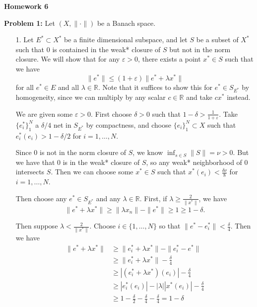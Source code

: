 \documentclass[11pt, reqno]{article}
\theoremstyle{plain}
\theoremstyle{definition}
\theoremstyle{remark}
\renewcommand{\epsilon}{\varepsilon}
\newcommand{\RR}{\mathbb{R}}
\begin{document}
\topmargin=-40pt
\renewcommand{\headrulewidth}{1pt}
\renewcommand{\headsep}{20pt}
\thispagestyle{fancy}

{\Huge \bfseries \noindent Homework 6}

\textbf{Problem 1:} Let $(X, \|\cdot\|)$ be a Banach space.

\begin{enumerate}
    \item[1.] Let $E^* \subset X^*$ be a finite dimensional subspace, and let $S$ be a subset
    of $X^*$ such that $0$ is contained in the weak* closure of $S$ but not in the norm closure. We will 
    show that for any $\epsilon > 0$, there exists a point $x^* \in S$ such that we have 
    \[
        \|e^*\| \leq (1 + \epsilon)\|e^* + \lambda x^*\|
    \]
    for all $e^* \in E$ and all $\lambda \in \RR$. Note that it suffices to show this for $e^* \in S_{E^*}$ by 
    homogeneity, since we can multiply by any scalar $c \in \RR$ and take $c x^*$ instead.

    We are given some $\epsilon > 0$. First choose $\delta > 0$ such that $1 - \delta > \frac{1}{1 + \epsilon}$.
    Take $\{e_i^*\}_1^N$ a $\delta/4$ net in $S_{E^*}$ by compactness, and choose $\{e_i\}_1^N \subset X$ such that 
    $e_i^*(e_i) > 1 - \delta/2$ for $i = 1, \dots, N$. 

    Since $0$ is not in the norm closure of $S$, we know $\inf_{s \in S}\|S\| = \nu > 0$. But we have that $0$ is
    in the weak* closure of $S$, so any weak* neighborhood of $0$ intersects $S$. Then we can choose some $x^* \in S$
    such that $x^*(e_i) < \frac{\delta \nu}{8}$ for $i = 1, \dots, N$. 

    Then choose any $e^* \in S_{E^*}$ and any $\lambda \in \RR$. First, if $\lambda \geq \frac{2}{\|x^*\|}$, we have 
    \[
        \|e^* + \lambda x^*\| \geq \|\lambda x_n\| - \|e^*\| \geq 1 \geq 1 - \delta.
    \]

    Then suppose $\lambda < \frac{2}{\|x^*\|}$. Choose $i \in \{1, \dots, N\}$ so that $\|e^* - e_i^*\| < \frac{\delta}{4}$. 
    Then we have 
    \begin{align*}
        \|e^* + \lambda x^*\| &\geq \|e_i^* + \lambda x^*\| - \|e_i^* - e^*\|\\
        & \geq \|e_i^* + \lambda x^*\| - \frac{\delta}{4}\\
        & \geq |(e_i^* + \lambda x^*)(e_i)| - \frac{\delta}{4}\\
        & \geq |e_i^*(e_i)| - |\lambda||x^*(e_i)| - \frac{\delta}{4}\\
        & \geq 1 - \frac{\delta}{2} - \frac{\delta}{4} - \frac{\delta}{4} = 1 - \delta
    \end{align*}


\end{enumerate}
\end{document}
